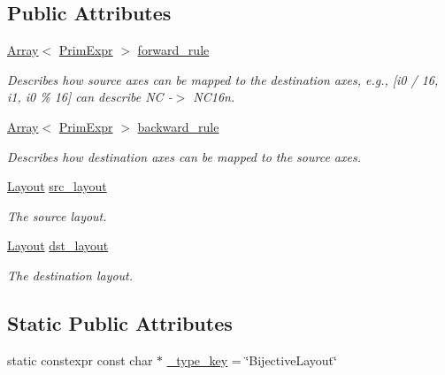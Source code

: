 \subsection*{Public Attributes}
\begin{DoxyCompactItemize}
\item 
\hyperlink{classtvm_1_1Array}{Array}$<$ \hyperlink{classtvm_1_1PrimExpr}{Prim\+Expr} $>$ \hyperlink{classtvm_1_1tir_1_1BijectiveLayoutNode_a21eb51d30c60622b38aec8a0953fd763}{forward\+\_\+rule}
\begin{DoxyCompactList}\small\item\em Describes how source axes can be mapped to the destination axes, e.\+g., \mbox{[}i0 / 16, i1, i0 \% 16\mbox{]} can describe NC -\/$>$ N\+C16n. \end{DoxyCompactList}\item 
\hyperlink{classtvm_1_1Array}{Array}$<$ \hyperlink{classtvm_1_1PrimExpr}{Prim\+Expr} $>$ \hyperlink{classtvm_1_1tir_1_1BijectiveLayoutNode_af412c66da78635c724c74c581242d6b0}{backward\+\_\+rule}
\begin{DoxyCompactList}\small\item\em Describes how destination axes can be mapped to the source axes. \end{DoxyCompactList}\item 
\hyperlink{classtvm_1_1tir_1_1Layout}{Layout} \hyperlink{classtvm_1_1tir_1_1BijectiveLayoutNode_a265fb704868822f0cdd00146353020d0}{src\+\_\+layout}
\begin{DoxyCompactList}\small\item\em The source layout. \end{DoxyCompactList}\item 
\hyperlink{classtvm_1_1tir_1_1Layout}{Layout} \hyperlink{classtvm_1_1tir_1_1BijectiveLayoutNode_a3d5c2dcbfb62a658a7779129aacd8950}{dst\+\_\+layout}
\begin{DoxyCompactList}\small\item\em The destination layout. \end{DoxyCompactList}\end{DoxyCompactItemize}
\subsection*{Static Public Attributes}
\begin{DoxyCompactItemize}
\item 
static constexpr const char $\ast$ \hyperlink{classtvm_1_1tir_1_1BijectiveLayoutNode_aff70675c76b7f2caf714c8de10e4167f}{\+\_\+type\+\_\+key} = \char`\"{}Bijective\+Layout\char`\"{}
\end{DoxyCompactItemize}


